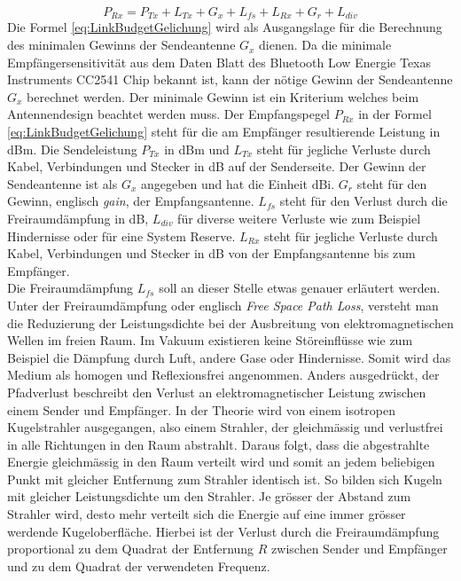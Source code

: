 \begin{equation}
P_{Rx} = P_{Tx}+L_{Tx}+G_{x}+L_{fs}+L_{Rx}+G_{r}+L_{div}\label{eq:LinkBudgetGelichung}
\end{equation}
Die Formel \ref{eq:LinkBudgetGelichung} wird als Ausgangslage für die Berechnung des minimalen Gewinns der Sendeantenne $G_{x}$ dienen. Da  die minimale Empfängersensitivität aus dem Daten Blatt des  Bluetooth Low Energie Texas Instruments CC2541 Chip bekannt ist, kann der nötige Gewinn der Sendeantenne $G_{x}$ berechnet werden. Der minimale Gewinn ist ein Kriterium welches beim Antennendesign beachtet werden muss.
Der Empfangspegel $P_{Rx}$ in der Formel \ref{eq:LinkBudgetGelichung}  steht für die am Empfänger resultierende Leistung in dBm.  Die Sendeleistung $P_{Tx}$ in dBm und $L_{Tx}$ steht für jegliche Verluste durch Kabel, Verbindungen und Stecker in dB auf der Senderseite. Der Gewinn der Sendeantenne ist als $G_{x}$ angegeben und hat die Einheit dBi. $G_{r}$ steht für den Gewinn, englisch \textit{gain}, der Empfangsantenne. $L_{fs}$ steht für den Verlust durch die Freiraumdämpfung in dB, $L_{div}$  für diverse weitere Verluste wie zum Beispiel Hindernisse oder für eine System Reserve.  $L_{Rx}$ steht für jegliche Verluste durch Kabel, Verbindungen und Stecker in dB von der Empfangsantenne bis zum Empfänger.\\

Die Freiraumdämpfung $L_{fs}$ soll an dieser Stelle etwas genauer erläutert werden. Unter der Freiraumdämpfung oder englisch \textit{Free Space Path Loss},  versteht man die Reduzierung der Leistungsdichte bei der Ausbreitung von elektromagnetischen Wellen im freien Raum. Im Vakuum existieren keine Störeinflüsse wie zum Beispiel die Dämpfung durch Luft, andere Gase oder  Hindernisse. Somit wird das Medium als homogen  und Reflexionsfrei angenommen. Anders ausgedrückt, der Pfadverlust beschreibt den Verlust an elektromagnetischer Leistung zwischen einem Sender und Empfänger.
In der Theorie wird von einem isotropen Kugelstrahler ausgegangen, also einem Strahler, der gleichmässig und verlustfrei in alle Richtungen in den Raum abstrahlt. Daraus folgt, dass die abgestrahlte Energie gleichmässig in den Raum verteilt wird und somit an jedem beliebigen Punkt mit gleicher Entfernung zum Strahler identisch ist. So bilden sich Kugeln mit gleicher Leistungsdichte um den Strahler. Je grösser der Abstand zum Strahler wird, desto mehr verteilt sich die Energie auf eine immer grösser werdende Kugeloberfläche. Hierbei ist der Verlust durch die Freiraumdämpfung proportional zu dem Quadrat der Entfernung $R$ zwischen Sender und Empfänger und zu dem Quadrat der verwendeten Frequenz.
\cite{linkbudget}

